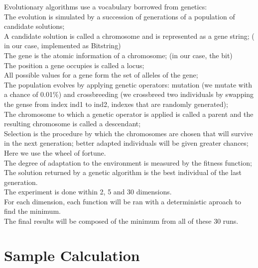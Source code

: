 \documentclass{article}
\begin{document}
Evolutionary algorithms use a vocabulary borrowed from genetics:\\
The evolution is simulated by a succession of generations of a population of candidate solutions;\\
A candidate solution is called a chromosome and is represented as a gene string; ( in our case, implemented as Bitstring) \\
The gene is the atomic information of a chromosome;  (in our case, the bit)\\
The position a gene occupies is called a locus; \\
All possible values for a gene form the set of alleles of the gene; \\
The population evolves by applying genetic operators: mutation (we mutate with a chance of 0.01\%)  and crossbreeding (we crossbreed two individuals by swapping the gense from index ind1 to ind2, indexes that are randomly generated); \\
The chromosome to which a genetic operator is applied is called a parent and the resulting chromosome is called a descendant; \\
Selection is the procedure by which the chromosomes are chosen that will survive in the next generation; better adapted individuals will be given greater chances; 
Here we use the wheel of fortune. \\
The degree of adaptation to the environment is measured by the fitness function;\\
The solution returned by a genetic algorithm is the best individual of the last generation. \\
The experiment is done within 2, 5 and 30 dimensions.\\ 
For each dimension, each function will be ran with a deterministic aproach to find the minimum.\\
The final results will be composed of the minimum from all of these 30 runs.\\




\section{Sample Calculation}
\end{document}
